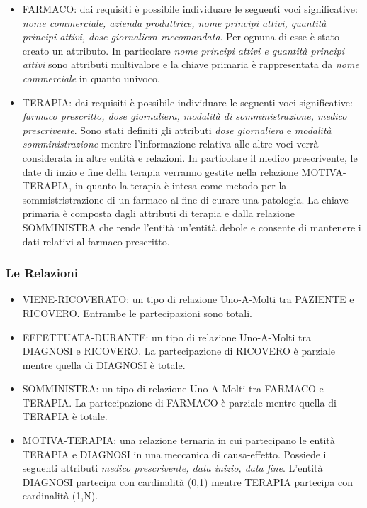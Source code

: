 \documentclass{article}
\begin{document}
\begin{itemize}
    \item FARMACO: dai requisiti è possibile individuare le seguenti voci
          significative: \textit{nome commerciale, azienda produttrice, 
          nome principi attivi, quantità principi attivi, dose giornaliera
          raccomandata}. Per ognuna di esse è stato creato un attributo. In
          particolare \textit{nome principi attivi e quantità principi 
          attivi} sono attributi multivalore e la chiave primaria è 
          rappresentata da \textit{nome commerciale} in quanto univoco.
          
    \item TERAPIA: dai requisiti è possibile individuare le seguenti voci
          significative: \textit{farmaco prescritto, dose giornaliera, 
          modalità di somministrazione, medico prescrivente}. 
          Sono stati definiti gli attributi \textit{dose giornaliera} e 
          \textit{modalità somministrazione} mentre l'informazione relativa
          alle altre voci verrà considerata in altre entità e relazioni.
          In particolare il medico prescrivente, le date di inzio e fine 
          della terapia verranno gestite nella relazione MOTIVA-TERAPIA,
          in quanto la terapia è intesa come metodo per la sommistristrazione 
          di un farmaco al fine di curare una patologia. La 
          chiave primaria è composta dagli attributi di terapia e dalla
          relazione SOMMINISTRA che rende l'entità un'entità debole e consente 
          di mantenere i dati relativi al farmaco prescritto.



\end{itemize}

\subsubsection{Le Relazioni}
\begin{itemize}
    \item VIENE-RICOVERATO: un tipo di relazione Uno-A-Molti tra PAZIENTE e
          RICOVERO. Entrambe le partecipazioni sono totali.
    
    \item EFFETTUATA-DURANTE: un tipo di relazione Uno-A-Molti tra DIAGNOSI 
          e RICOVERO. La partecipazione di RICOVERO è parziale mentre quella
          di DIAGNOSI è totale.

    \item SOMMINISTRA: un tipo di relazione Uno-A-Molti tra FARMACO e TERAPIA.
          La partecipazione di FARMACO è parziale mentre quella di
          TERAPIA è totale.
    
    \item MOTIVA-TERAPIA: una relazione ternaria in cui partecipano le entità
          TERAPIA e DIAGNOSI in una meccanica di causa-effetto. Possiede i
          seguenti attributi \textit{medico prescrivente, data inizio, data  fine}. 
          L'entità DIAGNOSI partecipa con cardinalità (0,1) mentre TERAPIA 
          partecipa con cardinalità (1,N).
\end{itemize}      
            
\end{document}

